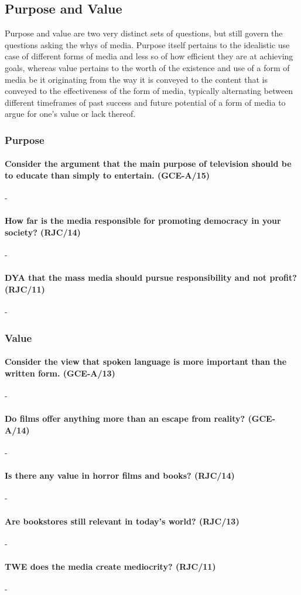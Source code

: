 \documentclass[../../main]{subfiles}
\begin{document}
\subsection{Purpose and Value}

Purpose and value are two very distinct sets of questions, but still govern the questions asking the whys of media. Purpose itself pertains to the idealistic use case of different forms of media and less so of how efficient they are at achieving goals, whereas value pertains to the worth of the existence and use of a form of media be it originating from the way it is conveyed to the content that is conveyed to the effectiveness of the form of media, typically alternating between different timeframes of past success and future potential of a form of media to argue for one's value or lack thereof. 

\subsubsection{Purpose}

\paragraph{Consider the argument that the main purpose of television should be to educate than simply to entertain. (GCE-A/15)}-

\paragraph{How far is the media responsible for promoting democracy in your society? (RJC/14)}-

\paragraph{DYA that the mass media should pursue responsibility and not profit? (RJC/11)}-

\subsubsection{Value}

\paragraph{Consider the view that spoken language is more important than the written form. (GCE-A/13)         }-

\paragraph{Do films offer anything more than an escape from reality? (GCE-A/14)} -

\paragraph{Is there any value in horror films and books? (RJC/14)}-

\paragraph{Are bookstores still relevant in today's world? (RJC/13)}-

\paragraph{TWE does the media create mediocrity? (RJC/11)}-
\end{document}
